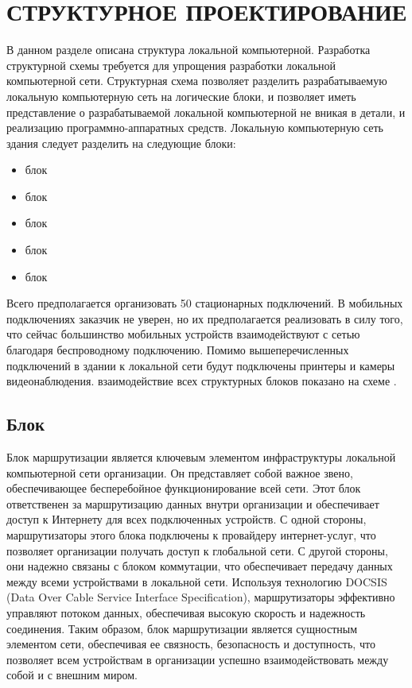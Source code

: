 \section{СТРУКТУРНОЕ ПРОЕКТИРОВАНИЕ}
\label{sec:sys}

В данном разделе описана структура локальной компьютерной. Разработка структурной схемы требуется 
для упрощения разработки локальной компьютерной сети. Структурная схема позволяет разделить
разрабатываемую локальную компьютерную сеть на логические блоки, и позволяет иметь представление о разрабатываемой 
локальной компьютерной не вникая в детали, и реализацию программно-аппаратных средств. Локальную компьютерную сеть 
здания следует разделить на следующие блоки:

\begin{itemize}
    \item блок \blockRoute
    \item блок \blockSwith
    \item блок \blockDevices
    \item блок \blockVideo
    \item блок \blockAccessPoint
\end{itemize}

Всего предполагается организовать 50 стационарных подключений. В мобильных подключениях заказчик не уверен, 
но их предполагается реализовать в силу того, что сейчас большинство мобильных устройств взаимодействуют с сетью благодаря 
беспроводному подключению. Помимо вышеперечисленных подключений в здании к локальной сети будут подключены принтеры и камеры видеонаблюдения.
взаимодействие всех структурных блоков показано на схеме \structScheme.

\subsection{Блок \blockRoute}   

Блок маршрутизации является ключевым элементом инфраструктуры локальной компьютерной сети организации. Он представляет собой важное звено, 
обеспечивающее бесперебойное функционирование всей сети. Этот блок ответственен за маршрутизацию данных внутри организации и обеспечивает 
доступ к Интернету для всех подключенных устройств.
С одной стороны, маршрутизаторы этого блока подключены к провайдеру интернет-услуг, что позволяет организации получать доступ к глобальной сети. 
С другой стороны, они надежно связаны с блоком коммутации, что обеспечивает передачу данных между всеми устройствами в локальной сети.
Используя технологию DOCSIS (Data Over Cable Service Interface Specification), маршрутизаторы эффективно управляют потоком данных, обеспечивая 
высокую скорость и надежность соединения. Таким образом, блок маршрутизации является сущностным элементом сети, обеспечивая ее связность, 
безопасность и доступность, что позволяет всем устройствам в организации успешно взаимодействовать между собой и с внешним миром.

